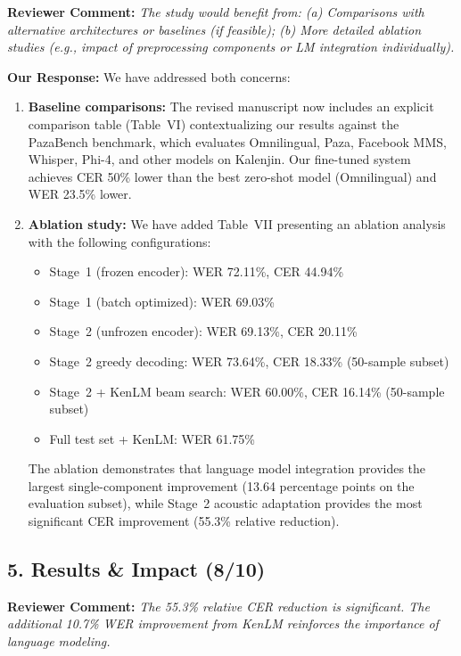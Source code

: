 \documentclass[11pt]{article}
\newcommand{\reviewercomment}[1]{\textcolor{reviewercolor}{\textbf{Reviewer Comment:} \textit{#1}}}
\newcommand{\response}[1]{\textcolor{responsecolor}{\textbf{Our Response:} #1}}
\begin{document}
\reviewercomment{The study would benefit from: (a) Comparisons with alternative architectures or baselines (if feasible); (b) More detailed ablation studies (e.g., impact of preprocessing components or LM integration individually).}

\response{We have addressed both concerns:}

\begin{enumerate}[label=(\alph*), noitemsep]
    \item \textbf{Baseline comparisons:} The revised manuscript now includes an explicit comparison table (Table~VI) contextualizing our results against the PazaBench benchmark, which evaluates Omnilingual, Paza, Facebook MMS, Whisper, Phi-4, and other models on Kalenjin. Our fine-tuned system achieves CER 50\% lower than the best zero-shot model (Omnilingual) and WER 23.5\% lower.
    
    \item \textbf{Ablation study:} We have added Table~VII presenting an ablation analysis with the following configurations:
    \begin{itemize}[noitemsep]
        \item Stage~1 (frozen encoder): WER 72.11\%, CER 44.94\%
        \item Stage~1 (batch optimized): WER 69.03\%
        \item Stage~2 (unfrozen encoder): WER 69.13\%, CER 20.11\%
        \item Stage~2 greedy decoding: WER 73.64\%, CER 18.33\% (50-sample subset)
        \item Stage~2 + KenLM beam search: WER 60.00\%, CER 16.14\% (50-sample subset)
        \item Full test set + KenLM: WER 61.75\%
    \end{itemize}
    The ablation demonstrates that language model integration provides the largest single-component improvement (13.64 percentage points on the evaluation subset), while Stage~2 acoustic adaptation provides the most significant CER improvement (55.3\% relative reduction).
\end{enumerate}

\vspace{1em}

\subsection*{5. Results \& Impact (8/10)}

\reviewercomment{The 55.3\% relative CER reduction is significant. The additional 10.7\% WER improvement from KenLM reinforces the importance of language modeling.}
\end{document}
